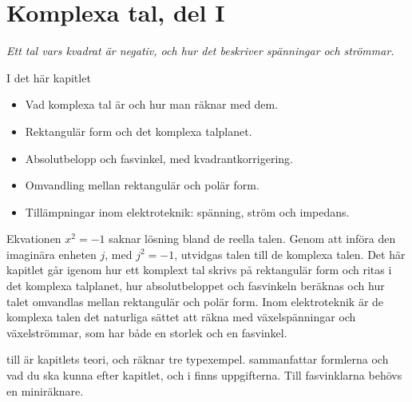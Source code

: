 
\chapter{Komplexa tal, del I}
\label{c15:ch}

{\large\itshape Ett tal vars kvadrat är negativ, och hur det beskriver spänningar och strömmar.\par}

\begin{chapterbox}{I det här kapitlet}
\begin{itemize}
  \item Vad komplexa tal är och hur man räknar med dem.
  \item Rektangulär form och det komplexa talplanet.
  \item Absolutbelopp och fasvinkel, med kvadrantkorrigering.
  \item Omvandling mellan rektangulär och polär form.
  \item Tillämpningar inom elektroteknik: spänning, ström och impedans.
\end{itemize}
\end{chapterbox}

Ekvationen $x^2 = -1$ saknar lösning bland de reella talen. Genom att införa den imaginära enheten
$j$, med $j^2 = -1$, utvidgas talen till de komplexa talen. Det här kapitlet går igenom hur ett
komplext tal skrivs på rektangulär form och ritas i det komplexa talplanet, hur absolutbeloppet
och fasvinkeln beräknas och hur talet omvandlas mellan rektangulär och polär form. Inom
elektroteknik är de komplexa talen det naturliga sättet att räkna med växelspänningar och
växelströmmar, som har både en storlek och en fasvinkel.

 till  är kapitlets teori, och
 räknar tre typexempel.  sammanfattar
formlerna och vad du ska kunna efter kapitlet, och i  finns uppgifterna.
Till fasvinklarna behövs en miniräknare.




